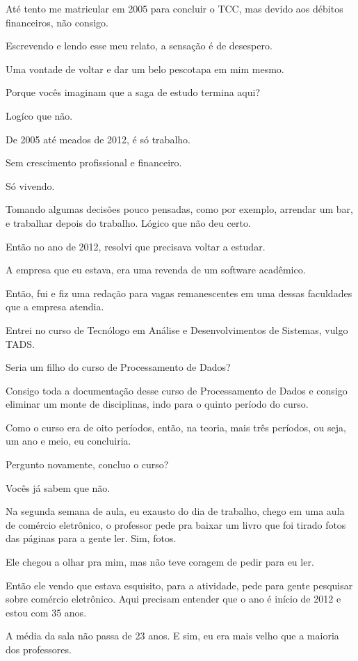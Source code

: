 Até tento me matricular em 2005 para concluir o TCC, mas devido aos débitos financeiros, não consigo.

Escrevendo e lendo esse meu relato, a sensação é de desespero.

Uma vontade de voltar e dar um belo pescotapa em mim mesmo.

Porque vocês imaginam que a saga de estudo termina aqui?

Logíco que não.

De 2005 até meados de 2012, é só trabalho. 

Sem crescimento profissional e financeiro. 

Só vivendo. 

Tomando algumas decisões pouco pensadas, como por exemplo, arrendar um bar, e trabalhar depois do trabalho. Lógico que não deu certo.

Então no ano de 2012, resolvi que precisava voltar a estudar.

A empresa que eu estava, era uma revenda de um software acadêmico. 

Então, fui e fiz uma redação para vagas remanescentes em uma dessas faculdades que a empresa atendia. 

Entrei no curso de Tecnólogo em Análise e Desenvolvimentos de Sistemas, vulgo TADS. 

Seria um filho do curso de Processamento de Dados? 

Consigo toda a documentação desse curso de Processamento de Dados e consigo eliminar um monte de disciplinas, indo para o quinto período do curso. 

Como o curso era de oito períodos, então, na teoria, mais três períodos, ou seja, um ano e meio, eu concluiria. 

Pergunto novamente, concluo o curso? 

Vocês já sabem que não.

Na segunda semana de aula, eu exausto do dia de trabalho, chego em uma aula de comércio eletrônico, o professor pede pra baixar um livro que foi tirado fotos das páginas para a gente ler. Sim, fotos.

Ele chegou a olhar pra mim, mas não teve coragem de pedir para eu ler. 

Então ele vendo que estava esquisito, para a atividade, pede para gente pesquisar sobre comércio eletrônico. Aqui precisam entender que o ano é início de 2012 e estou com 35 anos. 

A média da sala não passa de 23 anos. E sim, eu era mais velho que a maioria dos professores.

